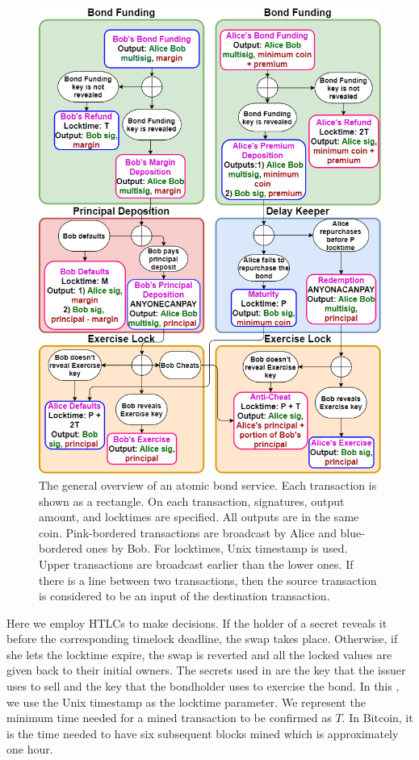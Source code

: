 \begin{figure}[h]
  \centering
  \includegraphics[width=\linewidth]{figures/ABDfateme.png}
  \caption{The general overview of an atomic bond service. Each transaction is shown as a rectangle. On each transaction, signatures, output amount, and locktimes are specified. All outputs are in the same coin. Pink-bordered transactions are broadcast by Alice and blue-bordered ones by Bob. For locktimes, Unix timestamp is used. Upper transactions are broadcast earlier than the lower ones. If there is a line between two transactions, then the source transaction is considered to be an input of the destination transaction.}
  \label{fig:non-collat-bond-no-checkseq}
\end{figure}

Here\newfateme{,} we employ HTLCs to make decisions. If the holder of a secret reveals it before the corresponding timelock deadline, the swap takes place. Otherwise, if she lets the locktime expire, the swap is reverted and all the locked values are given back to their initial owners. The secrets used in  are the {\it \Aone} key that the issuer uses to sell and the {\it \keyone} key that the bondholder uses to exercise the bond. In this , we use the Unix timestamp as the locktime parameter. We represent the minimum time needed for a mined transaction to be confirmed as $T$. In Bitcoin, it is the time needed to have six subsequent blocks mined which is approximately one hour.

